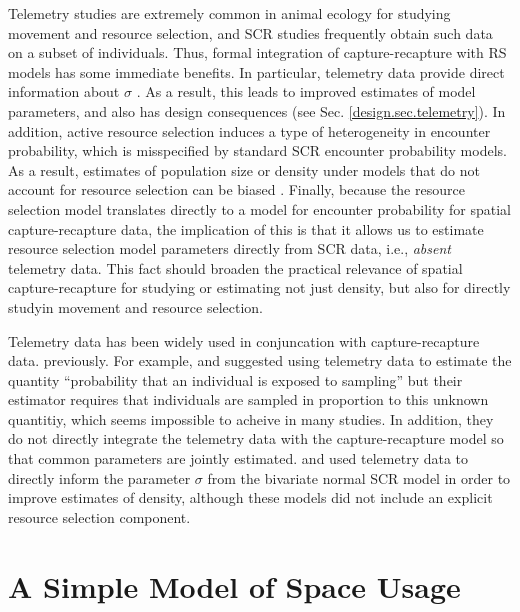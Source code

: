 Telemetry studies are extremely common in animal ecology for studying
movement and resource selection, and SCR studies frequently obtain
such data on a subset of individuals. Thus, formal integration of
capture-recapture with RS models has some immediate benefits.  In
particular, telemetry data provide direct information about $\sigma$
\citep{sollmann_etal:2012ecol,sollmann_etal:inprepjapplecol}. As a
result, this leads to improved estimates of model parameters, and also
has design consequences (see Sec. \ref{design.sec.telemetry}).  In
addition, active resource selection induces a type of heterogeneity in
encounter probability, which is misspecified by standard SCR encounter
probability models. As a result, estimates of population size or
density under models that do not account for resource selection can be
biased \citep{royle_etal:2012mee}.  Finally, because the resource
selection model translates directly to a model for encounter
probability for spatial capture-recapture data, the implication of
this is that it allows us to estimate resource selection model
parameters directly from SCR data, i.e., {\it absent} telemetry
data. This fact should broaden the practical relevance of spatial
capture-recapture for studying or estimating not just density, but
also for directly studyin movement and resource selection.


Telemetry data has been widely 
used in conjuncation with capture-recapture data.  previously. For
example, \citet{white_shenk:2001} and \citet{ivan:2012} suggested
using telemetry data to estimate the quantity ``probability that an
individual is exposed to sampling'' but their estimator requires that
individuals are sampled in proportion to this unknown quantitiy, which
seems impossible to acheive in many studies. In addition, they do not
directly integrate the telemetry data with the capture-recapture model
so that common parameters are jointly estimated.
\citet{sollmann_etal:inprepjapplecol} and
\citet{sollmann_etal:2012ecol} used telemetry data to directly inform
the parameter $\sigma$ from the bivariate normal SCR model in order to
improve estimates of density, although these models did not include an
explicit resource selection component.








\section{A Simple Model of Space Usage}
\label{rsf.sec.rsfmodel}

